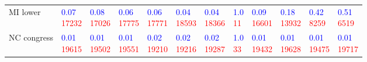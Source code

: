 \begin{tabular}{llllllllllll}
MI lower    &  \makecell{\textcolor{blue}{0.07} \\ \textcolor{red}{17232}} &  \makecell{\textcolor{blue}{0.08} \\ \textcolor{red}{17026}} &  \makecell{\textcolor{blue}{0.06} \\ \textcolor{red}{17775}} &  \makecell{\textcolor{blue}{0.06} \\ \textcolor{red}{17771}} &  \makecell{\textcolor{blue}{0.04} \\ \textcolor{red}{18593}} &  \makecell{\textcolor{blue}{0.04} \\ \textcolor{red}{18366}} &    \makecell{\textcolor{blue}{1.0} \\ \textcolor{red}{11}} &  \makecell{\textcolor{blue}{0.09} \\ \textcolor{red}{16601}} &  \makecell{\textcolor{blue}{0.18} \\ \textcolor{red}{13932}} &   \makecell{\textcolor{blue}{0.42} \\ \textcolor{red}{8259}} &   \makecell{\textcolor{blue}{0.51} \\ \textcolor{red}{6519}} \\
NC congress &  \makecell{\textcolor{blue}{0.01} \\ \textcolor{red}{19615}} &  \makecell{\textcolor{blue}{0.01} \\ \textcolor{red}{19502}} &  \makecell{\textcolor{blue}{0.01} \\ \textcolor{red}{19551}} &  \makecell{\textcolor{blue}{0.02} \\ \textcolor{red}{19210}} &  \makecell{\textcolor{blue}{0.02} \\ \textcolor{red}{19216}} &  \makecell{\textcolor{blue}{0.02} \\ \textcolor{red}{19287}} &    \makecell{\textcolor{blue}{1.0} \\ \textcolor{red}{33}} &  \makecell{\textcolor{blue}{0.01} \\ \textcolor{red}{19432}} &  \makecell{\textcolor{blue}{0.01} \\ \textcolor{red}{19628}} &  \makecell{\textcolor{blue}{0.01} \\ \textcolor{red}{19475}} &  \makecell{\textcolor{blue}{0.01} \\ \textcolor{red}{19717}} \\

\end{tabular}
